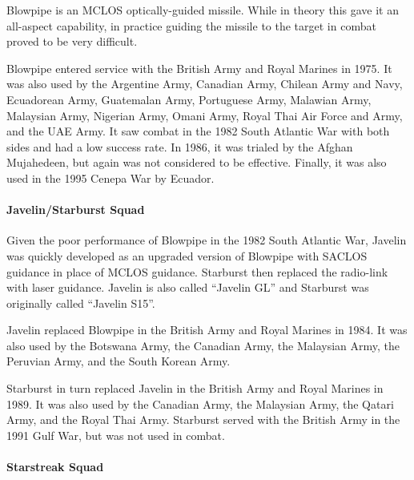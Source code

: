 Blowpipe is an MCLOS optically-guided missile.
While in theory this gave it an all-aspect capability, in practice guiding the missile to the target in combat proved to be very difficult.%

Blowpipe entered service with the British Army and Royal Marines in 1975.
It was also used by the Argentine Army, Canadian Army, Chilean Army and Navy, Ecuadorean Army, Guatemalan Army, Portuguese Army, Malawian Army, Malaysian Army, Nigerian Army, Omani Army, Royal Thai Air Force and Army, and the UAE Army.
It saw combat in the 1982 South Atlantic War with both sides and had a low success rate.
In 1986, it was trialed by the Afghan Mujahedeen, but again was not considered to be effective.
Finally, it was also used in the 1995 Cenepa War by Ecuador.

\paragraph{Javelin/Starburst Squad}

Given the poor performance of Blowpipe in the 1982 South Atlantic War, Javelin was quickly developed as an upgraded version of Blowpipe with SACLOS guidance in place of MCLOS guidance. Starburst then replaced the radio-link with laser guidance. Javelin is also called “Javelin GL” and Starburst was originally called “Javelin S15”.%

Javelin replaced Blowpipe in the British Army and Royal Marines in 1984.
It was also used by the Botswana Army, the Canadian Army, the Malaysian Army, the Peruvian Army, and the South Korean Army.

Starburst in turn replaced Javelin in the British Army and Royal Marines in 1989.
It was also used by the Canadian Army, the Malaysian Army, the Qatari Army, and the Royal Thai Army.
Starburst served with the British Army in the 1991 Gulf War, but was not used in combat.

\paragraph{Starstreak Squad}

